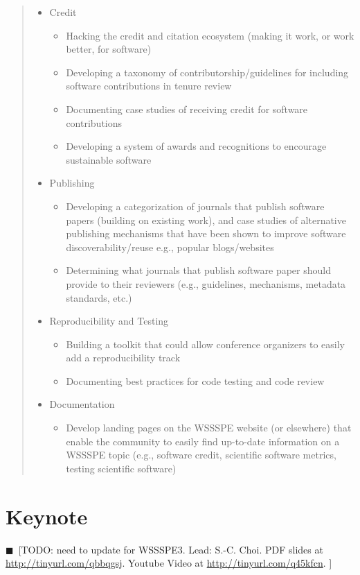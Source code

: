\documentclass[11pt, oneside]{amsart}
\newcommand{\todo}[1]{{\color{blue}$\blacksquare$~\textsf{[TODO: #1]}}}
\begin{document}
\begin{quote}
\begin{itemize}
\item Credit
\begin{itemize}
\item Hacking the credit and citation ecosystem (making it work, or work better,
for software)
\item Developing a taxonomy of contributorship/guidelines for including software
contributions in tenure review
\item Documenting case studies of receiving credit for software contributions
\item Developing a system of awards and recognitions to encourage sustainable software
\end{itemize}

\item Publishing
\begin{itemize}
\item Developing a categorization of journals that publish software papers
(building on existing work), and case studies of alternative publishing
mechanisms that have been shown to improve software discoverability/reuse e.g.,
popular blogs/websites
\item Determining what journals that publish software paper should provide to
their reviewers (e.g., guidelines, mechanisms, metadata standards, etc.)
\end{itemize}

\item Reproducibility and Testing
\begin{itemize}
\item Building a toolkit that could allow conference organizers to easily add a
reproducibility track
\item Documenting best practices for code testing and code review
\end{itemize}

\item Documentation
\begin{itemize}
\item Develop landing pages on the WSSSPE website (or elsewhere) that enable the
community to easily find up-to-date information on a WSSSPE topic (e.g.,
software credit, scientific software metrics, testing scientific software)
\end{itemize}

\end{itemize}
\end{quote}


\section{Keynote} \label{sec:keynote} 
\todo{need to update for WSSSPE3. 
Lead: S.-C. Choi. 
PDF slides at \url{http://tinyurl.com/qbbqgsj}.
Youtube Video at \url{http://tinyurl.com/q45kfcn}.
}
\end{document}
